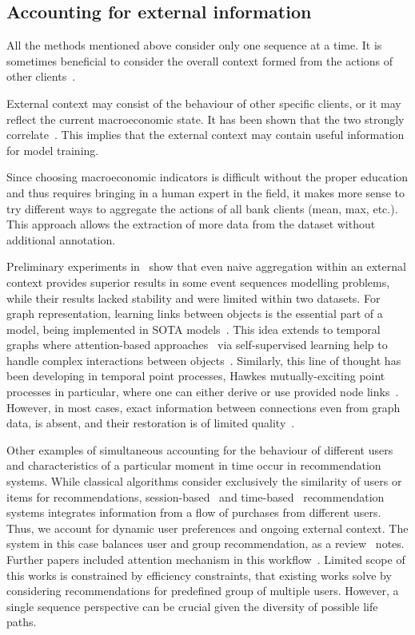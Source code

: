 \subsection{Accounting for external information}
All the methods mentioned above consider only one sequence at a time. It is sometimes beneficial to consider the overall context formed from the actions of other clients~\cite{ala2022deep}.

External context may consist of the behaviour of other specific clients, or it may reflect the current macroeconomic state. It has been shown that the two strongly correlate~\cite{thomas2000survey,begicheva2021bank}. This implies that the external context may contain useful information for model training.

Since choosing macroeconomic indicators is difficult without the proper education and thus requires bringing in a human expert in the field, it makes more sense to try different ways to aggregate the actions of all bank clients (mean, max, etc.). This approach allows the extraction of more data from the dataset without additional annotation.

Preliminary experiments in~\cite{bazarova2024universal} show that even naive aggregation within an external context provides superior results in some event sequences modelling problems, while their results lacked stability and were limited within two datasets.
For graph representation, learning links between objects is the essential part of a model, being implemented in SOTA models~\cite{kipf2022semi}.
This idea extends to temporal graphs where attention-based approaches~\cite{velivckovic2018graph} via self-supervised learning help to handle complex interactions between objects~\cite{liu2024self}.
Similarly, this line of thought has been developing in temporal point processes, Hawkes mutually-exciting point processes in particular, where one can either derive or use provided node links~\cite{dizaji2022comparative,passino2023mutually}. 
However, in most cases, exact information between connections even from graph data, is absent, and their restoration is of limited quality~\cite{shumovskaia2021linking}.

Other examples of simultaneous accounting for the behaviour of different users and characteristics of a particular moment in time occur in recommendation systems. While classical algorithms consider exclusively the similarity of users or items for recommendations, session-based~\cite{wang2021session} and time-based~\cite{ghiye2023timedecay, JAIN20231834, xia2010timedecay} recommendation systems integrates information from a flow of purchases from different users. Thus, we account for dynamic user preferences and ongoing external context.
The system in this case balances user and group recommendation, as a review~\cite{ceh2022performance} notes. 
Further papers included attention mechanism in this workflow~\cite{guo2020group}. 
Limited scope of this works is constrained by efficiency constraints, that existing works solve by considering recommendations for predefined group of multiple users.
However, a single sequence perspective can be crucial given the diversity of possible life paths.


